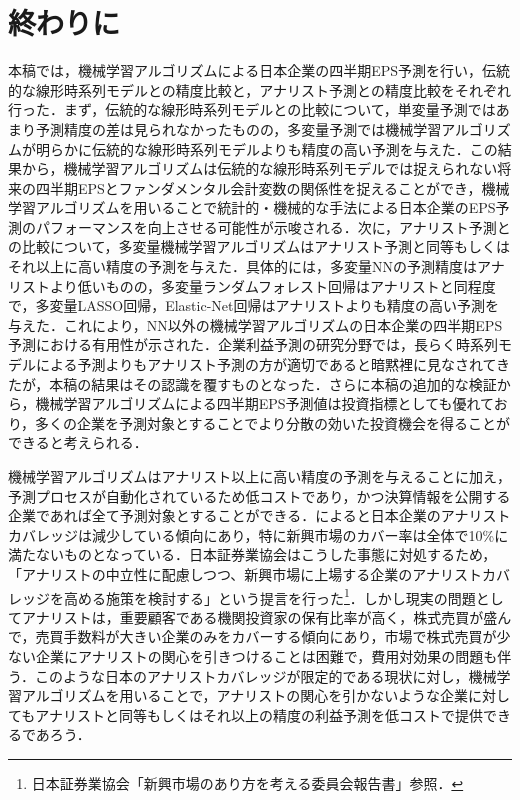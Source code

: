 \documentclass[a4paper，12pt]{jsarticle}
\begin{document}
\part{終わりに} \label{par:conclusion}

本稿では，機械学習アルゴリズムによる日本企業の四半期EPS予測を行い，伝統的な線形時系列モデルとの精度比較と，アナリスト予測との精度比較をそれぞれ行った．まず，伝統的な線形時系列モデルとの比較について，単変量予測ではあまり予測精度の差は見られなかったものの，多変量予測では機械学習アルゴリズムが明らかに伝統的な線形時系列モデルよりも精度の高い予測を与えた．この結果から，機械学習アルゴリズムは伝統的な線形時系列モデルでは捉えられない将来の四半期EPSとファンダメンタル会計変数の関係性を捉えることができ，機械学習アルゴリズムを用いることで統計的・機械的な手法による日本企業のEPS予測のパフォーマンスを向上させる可能性が示唆される．次に，アナリスト予測との比較について，多変量機械学習アルゴリズムはアナリスト予測と同等もしくはそれ以上に高い精度の予測を与えた．具体的には，多変量NNの予測精度はアナリストより低いものの，多変量ランダムフォレスト回帰はアナリストと同程度で，多変量LASSO回帰，Elastic-Net回帰はアナリストよりも精度の高い予測を与えた．これにより，NN以外の機械学習アルゴリズムの日本企業の四半期EPS予測における有用性が示された．企業利益予測の研究分野では，長らく時系列モデルによる予測よりもアナリスト予測の方が適切であると暗黙裡に見なされてきたが，本稿の結果はその認識を覆すものとなった．さらに本稿の追加的な検証から，機械学習アルゴリズムによる四半期EPS予測値は投資指標としても優れており，多くの企業を予測対象とすることでより分散の効いた投資機会を得ることができると考えられる．

機械学習アルゴリズムはアナリスト以上に高い精度の予測を与えることに加え，予測プロセスが自動化されているため低コストであり，かつ決算情報を公開する企業であれば全て予測対象とすることができる．\cite{yoneyama2010}によると日本企業のアナリストカバレッジは減少している傾向にあり，特に新興市場のカバー率は全体で10\%に満たないものとなっている．日本証券業協会はこうした事態に対処するため，「アナリストの中立性に配慮しつつ、新興市場に上場する企業のアナリストカバレッジを高める施策を検討する」という提言を行った\footnote{日本証券業協会「新興市場のあり方を考える委員会報告書」参照．}．しかし現実の問題としてアナリストは，重要顧客である機関投資家の保有比率が高く，株式売買が盛んで，売買手数料が大きい企業のみをカバーする傾向にあり\citep{nakai2006}，市場で株式売買が少ない企業にアナリストの関心を引きつけることは困難で，費用対効果の問題も伴う．このような日本のアナリストカバレッジが限定的である現状に対し，機械学習アルゴリズムを用いることで，アナリストの関心を引かないような企業に対してもアナリストと同等もしくはそれ以上の精度の利益予測を低コストで提供できるであろう．
\end{document}
